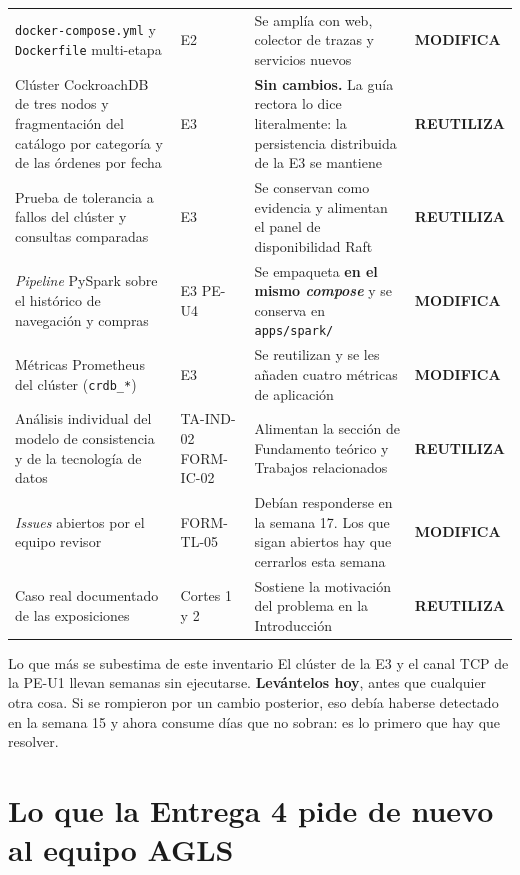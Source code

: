 \documentclass[11pt,a4paper]{article}
\newcommand{\reuso}{\cellcolor{filaReuso}\textbf{REUTILIZA}}
\newcommand{\cambia}{\cellcolor{filaCambia}\textbf{MODIFICA}}
\begin{document}
\begin{center}
\begin{longtable}{@{}p{3.7cm}p{1.5cm}p{5.2cm}p{4.4cm}@{}}
		\addlinespace
		\texttt{docker-compose.yml} y \texttt{Dockerfile} multi-etapa & E2 & Se amplía con web, colector de trazas y servicios nuevos & \cambia \\
		\addlinespace
		Clúster CockroachDB de tres nodos y fragmentación del catálogo por categoría y de las órdenes por fecha & E3 & \textbf{Sin cambios.} La guía rectora lo dice literalmente: la persistencia distribuida de la E3 se mantiene & \reuso \\
		\addlinespace
		Prueba de tolerancia a fallos del clúster y consultas comparadas & E3 & Se conservan como evidencia y alimentan el panel de disponibilidad Raft & \reuso \\
		\addlinespace
		\emph{Pipeline} PySpark sobre el histórico de navegación y compras & E3 \newline PE-U4 & Se empaqueta \textbf{en el mismo \emph{compose}} y se conserva en \texttt{apps/spark/} & \cambia \\
		\addlinespace
		Métricas Prometheus del clúster (\texttt{crdb\_*}) & E3 & Se reutilizan y se les añaden cuatro métricas de aplicación & \cambia \\
		\addlinespace
		Análisis individual del modelo de consistencia y de la tecnología de datos & TA-IND-02 \newline FORM-IC-02 & Alimentan la sección de Fundamento teórico y Trabajos relacionados & \reuso \\
		\addlinespace
		\emph{Issues} abiertos por el equipo revisor & FORM-TL-05 & Debían responderse en la semana 17. Los que sigan abiertos hay que cerrarlos esta semana & \cambia \\
		\addlinespace
		Caso real documentado de las exposiciones & Cortes 1 y 2 & Sostiene la motivación del problema en la Introducción & \reuso \\
		\bottomrule
	\end{longtable}
\end{center}

\begin{avisoBox}{Lo que más se subestima de este inventario}
	El clúster de la E3 y el canal TCP de la PE-U1 llevan semanas sin ejecutarse. \textbf{Levántelos hoy}, antes que cualquier otra cosa. Si se rompieron por un cambio posterior, eso debía haberse detectado en la semana 15 y ahora consume días que no sobran: es lo primero que hay que resolver.
\end{avisoBox}

\section{Lo que la Entrega 4 pide de nuevo al equipo AGLS}
\end{document}
